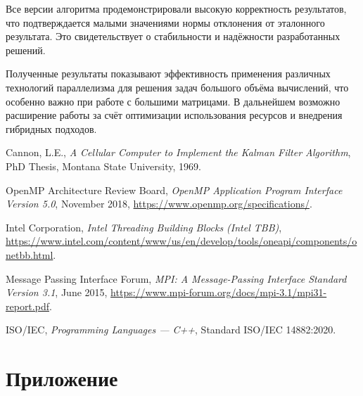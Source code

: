 \documentclass[12pt]{article}
\begin{document}
Все версии алгоритма продемонстрировали высокую корректность результатов, что подтверждается малыми значениями нормы отклонения от эталонного результата. Это свидетельствует о стабильности и надёжности разработанных решений.

Полученные результаты показывают эффективность применения различных технологий параллелизма для решения задач большого объёма вычислений, что особенно важно при работе с большими матрицами. В дальнейшем возможно расширение работы за счёт оптимизации использования ресурсов и внедрения гибридных подходов.

\newpage
\begin{thebibliography}{9}

Cannon, L.E.,
\textit{A Cellular Computer to Implement the Kalman Filter Algorithm},
PhD Thesis, Montana State University, 1969.

OpenMP Architecture Review Board,
\textit{OpenMP Application Program Interface Version 5.0},
November 2018,
\url{https://www.openmp.org/specifications/}.

Intel Corporation,
\textit{Intel Threading Building Blocks (Intel TBB)},
\url{https://www.intel.com/content/www/us/en/develop/tools/oneapi/components/onetbb.html}.

Message Passing Interface Forum,
\textit{MPI: A Message-Passing Interface Standard Version 3.1},
June 2015,
\url{https://www.mpi-forum.org/docs/mpi-3.1/mpi31-report.pdf}.

ISO/IEC,
\textit{Programming Languages — C++},
Standard ISO/IEC 14882:2020.
\end{thebibliography}

\newpage
\section*{Приложение}
\end{document}
